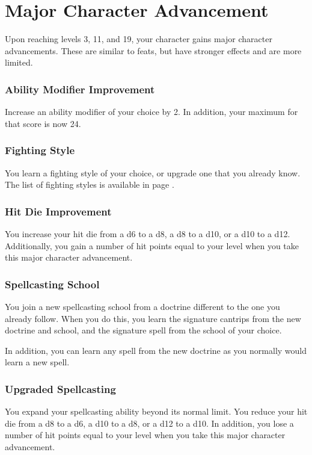\section{Major Character Advancement} \label{sec::majorcharacteradvancement}
Upon reaching levels 3, 11, and 19, your character gains major character advancements.
These are similar to feats, but have stronger effects and are more limited.

\subsubsection{Ability Modifier Improvement} \label{mca::abilitymodifierimprovement}
    Increase an ability modifier of your choice by 2.
    In addition, your maximum for that score is now 24.

\subsubsection{Fighting Style} \label{mca::fightingstyle}
    You learn a fighting style of your choice, or upgrade one that you already know.
    The list of fighting styles is available in page \pageref{ssec::fightingstyles}.

\subsubsection{Hit Die Improvement} \label{mca::hitdieimprovement}
    You increase your hit die from a d6 to a d8, a d8 to a d10, or a d10 to a d12.
    Additionally, you gain a number of hit points equal to your level when you take this major character advancement.

\subsubsection{Spellcasting School} \label{mca::spellcastingschool}
    You join a new spellcasting school from a doctrine different to the one you already follow.
    When you do this, you learn the signature cantrips from the new doctrine and school, and the signature spell from the school of your choice.

    In addition, you can learn any spell from the new doctrine as you normally would learn a new spell.

\subsubsection{Upgraded Spellcasting} \label{mca::upgradedspellcasting}
    You expand your spellcasting ability beyond its normal limit.
    You reduce your hit die from a d8 to a d6, a d10 to a d8, or a d12 to a d10.
    In addition, you lose a number of hit points equal to your level when you take this major character advancement.

